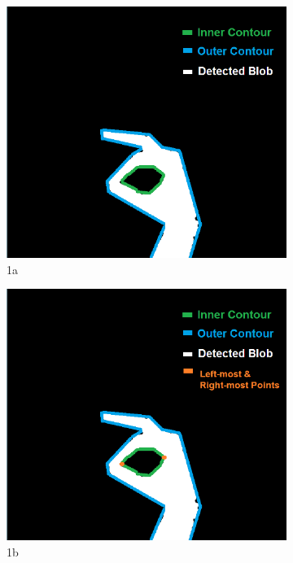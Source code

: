 \begin{figure}[H]
\begin{subfigure}{.5\textwidth}
  \centering
  \includegraphics[width=.8\linewidth]{Files/Figures/2.pdf}
  \caption{1a}
  \label{fig:sfig11}
\end{subfigure}%
\begin{subfigure}{.5\textwidth}
  \centering
  \includegraphics[width=.8\linewidth]{Files/Figures/3.pdf}
  \caption{1b}
  \label{fig:sfig22}
\end{subfigure}\\
\begin{subfigure}{.5\textwidth}
  \centering

\end{subfigure}
\end{figure}
